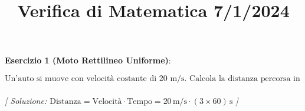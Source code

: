 \documentclass{article}
\title{\raggedright Verifica di Matematica  7/1/2024}
\date{}
\begin{document}
\maketitle

\textbf{Esercizio 1 (Moto Rettilineo Uniforme)}:\\
\par $\text{Un'auto si muove con velocit\`a costante di 20 m/s. Calcola la distanza percorsa in 3 minuti.}$ \\\\

\textit{[ Soluzione: $\text{Distanza} = \text{Velocit\`a} \cdot \text{Tempo} = 20 \, \text{m/s} \cdot (3 \times 60) \, \text{s}$ ]}\\\\
\end{document}
